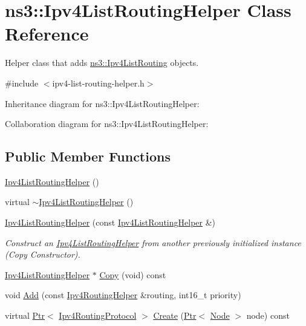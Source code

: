 \hypertarget{classns3_1_1Ipv4ListRoutingHelper}{}\section{ns3\+:\+:Ipv4\+List\+Routing\+Helper Class Reference}
\label{classns3_1_1Ipv4ListRoutingHelper}


Helper class that adds \hyperlink{classns3_1_1Ipv4ListRouting}{ns3\+::\+Ipv4\+List\+Routing} objects.  




{\ttfamily \#include $<$ipv4-\/list-\/routing-\/helper.\+h$>$}



Inheritance diagram for ns3\+:\+:Ipv4\+List\+Routing\+Helper\+:


Collaboration diagram for ns3\+:\+:Ipv4\+List\+Routing\+Helper\+:
\subsection*{Public Member Functions}
\begin{DoxyCompactItemize}
\item 
\hyperlink{classns3_1_1Ipv4ListRoutingHelper_a24e6104f6f8c59d26b6c613592fe7ad2}{Ipv4\+List\+Routing\+Helper} ()
\item 
virtual \hyperlink{classns3_1_1Ipv4ListRoutingHelper_a7a0a4bbf2f638ede6512613293ff4258}{$\sim$\+Ipv4\+List\+Routing\+Helper} ()
\item 
\hyperlink{classns3_1_1Ipv4ListRoutingHelper_a35d3af1a546ad7ddd1670da752bb82a2}{Ipv4\+List\+Routing\+Helper} (const \hyperlink{classns3_1_1Ipv4ListRoutingHelper}{Ipv4\+List\+Routing\+Helper} \&)
\begin{DoxyCompactList}\small\item\em Construct an \hyperlink{classns3_1_1Ipv4ListRoutingHelper}{Ipv4\+List\+Routing\+Helper} from another previously initialized instance (Copy Constructor). \end{DoxyCompactList}\item 
\hyperlink{classns3_1_1Ipv4ListRoutingHelper}{Ipv4\+List\+Routing\+Helper} $\ast$ \hyperlink{classns3_1_1Ipv4ListRoutingHelper_ad3fd2a48714f76a854da26da012d8cf3}{Copy} (void) const 
\item 
void \hyperlink{classns3_1_1Ipv4ListRoutingHelper_a697287d45297478735082f691ad06fa3}{Add} (const \hyperlink{classns3_1_1Ipv4RoutingHelper}{Ipv4\+Routing\+Helper} \&routing, int16\+\_\+t priority)
\item 
virtual \hyperlink{classns3_1_1Ptr}{Ptr}$<$ \hyperlink{classns3_1_1Ipv4RoutingProtocol}{Ipv4\+Routing\+Protocol} $>$ \hyperlink{classns3_1_1Ipv4ListRoutingHelper_aba2da53223e807fc446608c3b6f078c7}{Create} (\hyperlink{classns3_1_1Ptr}{Ptr}$<$ \hyperlink{classns3_1_1Node}{Node} $>$ node) const 
\end{DoxyCompactItemize}
